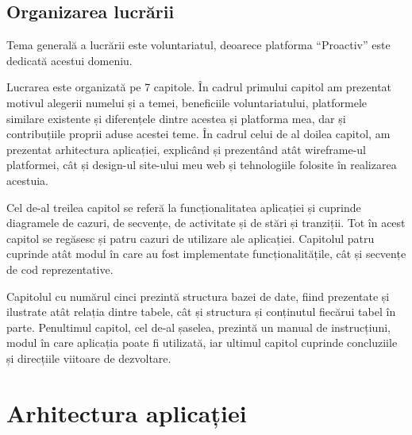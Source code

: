 \documentclass[12pt,a4paper]{report}
\begin{document}
\section{Organizarea lucrării}
\par
Tema generală a lucrării este voluntariatul, deoarece platforma “Proactiv” este dedicată acestui domeniu.
\\\par 
Lucrarea este organizată pe 7 capitole. În cadrul primului capitol am prezentat motivul alegerii numelui și a temei, beneficiile voluntariatului, platformele similare existente și diferențele dintre acestea și platforma mea, dar și contribuțiile proprii aduse acestei teme. În cadrul celui de al doilea capitol, am prezentat arhitectura aplicației, explicând și prezentând atât wireframe-ul platformei, cât și design-ul site-ului meu web și tehnologiile folosite în realizarea acestuia.
\\\par 
Cel de-al treilea capitol se referă la funcționalitatea aplicației și cuprinde diagramele de cazuri, de secvențe, de activitate și de stări și tranziții. Tot în acest capitol se regăsesc și patru cazuri de utilizare ale aplicației. Capitolul patru cuprinde atât modul în care au fost implementate funcționalitățile, cât și secvențe de cod reprezentative.
\\\par 
Capitolul cu numărul cinci prezintă structura bazei de date, fiind prezentate și ilustrate atât relația dintre tabele, cât și structura și conținutul fiecărui tabel în parte. Penultimul capitol, cel de-al șaselea, prezintă un manual de instrucțiuni, modul în care aplicația poate fi utilizată, iar ultimul capitol cuprinde concluziile și direcțiile viitoare de dezvoltare.


\chapter{Arhitectura aplicației}
\end{document}

